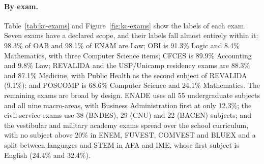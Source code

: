 \paragraph{By exam.} Table~\ref{tab:kc-exams} and Figure~\ref{fig:kc-exams}
show the labels of each exam. Seven exams have a declared scope, and their
labels fall almost entirely within it: 98.3\% of OAB and 98.1\% of ENAM are
Law; OBI is 91.3\% Logic and 8.4\% Mathematics, with three Computer Science
items; CFCES is 89.9\% Accounting and 9.8\% Law; REVALIDA and the USP/Unicamp
residency exams are 88.3\% and 87.1\% Medicine, with Public Health as the
second subject of REVALIDA (9.1\%); and POSCOMP is 68.6\% Computer Science
and 24.1\% Mathematics. The remaining exams are broad by design. ENADE uses
all 55 undergraduate subjects and all nine macro-areas, with Business
Administration first at only 12.3\%; the civil-service exams use 38 (BNDES),
29 (CNU) and 22 (BACEN) subjects; and the vestibular and military academy
exams spread over the school curriculum, with no subject above 20\% in ENEM,
FUVEST, COMVEST and BLUEX and a split between languages and STEM in AFA and
IME, whose first subject is English (24.4\% and 32.4\%).

